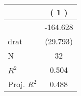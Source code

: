 
\begin{tabular}{lc}
\toprule
 & ( 1 )\\
\midrule
 & -164.628\\

\multirow{-2}{*}{\raggedright\arraybackslash drat} & (29.793)\\

\midrule
N & 32\\

$R^2$ & 0.504\\

Proj. $R^2$ & 0.488\\
\bottomrule
\end{tabular}
